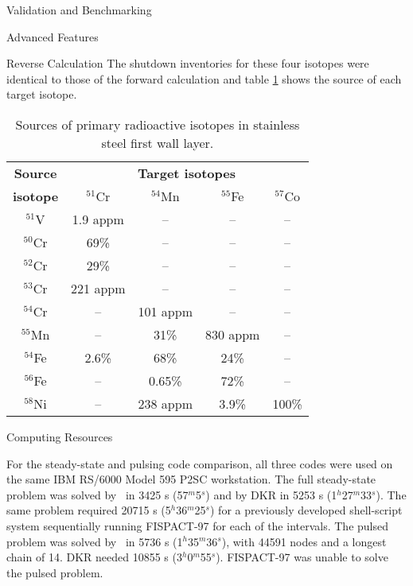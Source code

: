 \begin{chapter}{Validation and Benchmarking\label{chap:valid}}
\begin{section}{Advanced Features}
\begin{subsection}{Reverse Calculation}
      The shutdown inventories for these four isotopes were identical
      to those of the forward calculation and table
      \ref{tab:valid.reverse} shows the source of each target isotope.

      \begin{table}[htbp]
        \begin{center}
          \leavevmode
          \begin{tabular}{|c|c|c|c|c|}
            \hline
            \textbf{Source}  & \multicolumn{4}{c|}{\textbf{Target isotopes}} \\\cline{2-5}
            \textbf{isotope} & $^{51}$Cr & $^{54}$Mn & $^{55}$Fe & $^{57}$Co \\\hline\hline
            $^{51}$V & 1.9 appm &  -- &  -- &  -- \\\hline
            $^{50}$Cr & 69\% & -- &  -- &  -- \\\hline
            $^{52}$Cr & 29\% & -- &  -- &  -- \\\hline
            $^{53}$Cr & 221 appm & -- &  -- &  -- \\\hline
            $^{54}$Cr & -- & 101 appm &  -- &  -- \\\hline
            $^{55}$Mn & -- & 31\% & 830 appm &  -- \\\hline
            $^{54}$Fe & 2.6\%  & 68\% & 24\% &  -- \\\hline
            $^{56}$Fe & -- & 0.65\%  & 72\%  &  -- \\\hline
            $^{58}$Ni & -- & 238 appm & 3.9\% &  100\%\\\hline
          \end{tabular}
          \caption{Sources of primary radioactive isotopes in stainless steel first wall layer.}
          \label{tab:valid.reverse}
        \end{center}
      \end{table}
      
    \end{subsection}
  \end{section}
  
  \begin{section}{Computing Resources}
    
    
    For the steady-state and pulsing code comparison, all three codes
    were used on the same IBM RS/6000 Model 595 P2SC workstation.  The
    full steady-state problem was solved by \ALARA\ in 3425 s
    (57$^m$5$^s$) and by DKR in 5253 s (1$^h$27$^m$33$^s$).  The same
    problem required 20715 s (5$^h$36$^m$25$^s$) for a previously
    developed shell-script system sequentially running FISPACT-97 for
    each of the intervals.  The pulsed problem was solved by \ALARA\ 
    in 5736 s (1$^h$35$^m$36$^s$), with 44591 nodes and a longest
    chain of 14.  DKR needed 10855 s (3$^h$0$^m$55$^s$).  FISPACT-97
    was unable to solve the pulsed problem.
    

\end{section}
\end{chapter}
